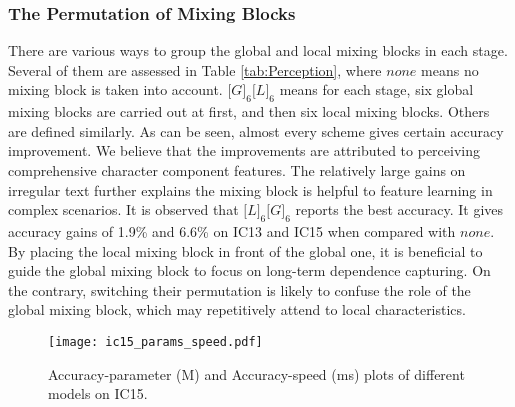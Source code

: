 \documentclass{article}
\begin{document}
\begin{table}[t]
\centering
{}

\caption{Ablation study on mixing block permutation.}
\label{tab:Perception}
\end{table}

\subsubsection{The Permutation of Mixing Blocks}
There are various ways to group the global and local mixing blocks in each stage. Several of them are assessed in Table \ref{tab:Perception}, where $none$ means no mixing block is taken into account. ${[}G{]}_6{[}L{]}_6$ means for each stage, six global mixing blocks are carried out at first, and then six local mixing blocks. Others are defined similarly. As can be seen, almost every scheme gives certain accuracy improvement. We believe that the improvements are attributed to perceiving comprehensive character component features. The relatively large gains on irregular text further explains the mixing block is helpful to feature learning in complex scenarios. It is observed that ${[}L{]}_6{[}G{]}_6$ reports the best accuracy. It gives accuracy gains of 1.9\% and 6.6\% on IC13 and IC15 when compared with $none$. By placing the local mixing block in front of the global one, it is beneficial to guide the global mixing block to focus on long-term dependence capturing. On the contrary, switching their permutation is likely to confuse the role of the global mixing block, which may repetitively attend to local characteristics.


\begin{figure}[t]  
\centering  
\texttt{[image: ic15\_params\_speed.pdf]}  
\caption{Accuracy-parameter (M) and Accuracy-speed (ms) plots of different models on IC15.}  
\label{fig:params_speed}  
\end{figure}
\end{document}
